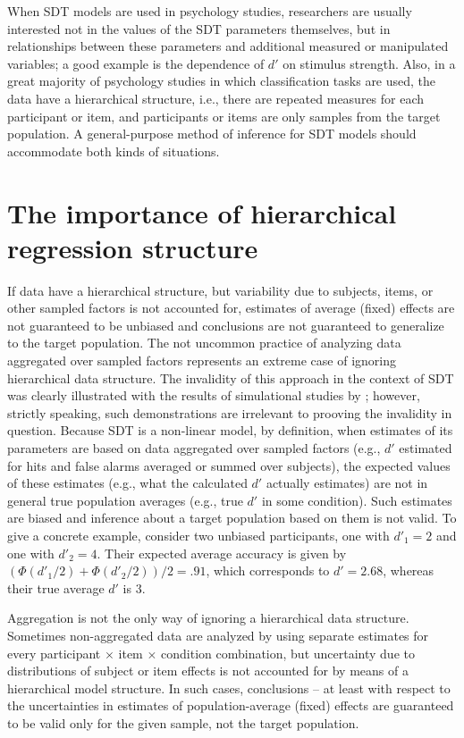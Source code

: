 \documentclass[a4paper,man,apacite,floatsintext]{apa6}
\begin{document}
When SDT models are used in psychology studies, researchers are
usually interested not in the values of the SDT parameters themselves,
but in relationships between these parameters and additional measured
or manipulated variables; a good example is the dependence of $d'$ on
stimulus strength. Also, in a great majority of psychology studies in
which classification tasks are used, the data have a hierarchical
structure, i.e., there are repeated measures for each participant or
item, and participants or items are only samples from the target
population. A general-purpose method of inference for SDT models
should accommodate both kinds of situations.

\section{The importance of hierarchical regression structure}

If data have a hierarchical structure, but variability due to
subjects, items, or other sampled factors is not accounted for,
estimates of average (fixed) effects are not guaranteed to be unbiased
and conclusions are not guaranteed to generalize to the target
population. The not uncommon practice of analyzing data aggregated
over sampled factors represents an extreme case of ignoring
hierarchical data structure. The invalidity of this approach in the
context of SDT was clearly illustrated with the results of
simulational studies by ; however,
strictly speaking, such demonstrations are irrelevant to prooving the
invalidity in question. Because SDT is a non-linear model, by
definition, when estimates of its parameters are based on data
aggregated over sampled factors (e.g., $d'$ estimated for hits and
false alarms averaged or summed over subjects), the expected values of
these estimates (e.g., what the calculated $d'$ actually estimates)
are not in general true population averages (e.g., true $d'$ in some
condition). Such estimates are biased and inference about a target
population based on them is not valid. To give a concrete example,
consider two unbiased participants, one with $d'_1 = 2$ and one with
$d'_2 = 4$. Their expected average accuracy is given by $(\Phi(d'_1/2)
+ \Phi(d'_2/2)) / 2 = .91$, which corresponds to $d' = 2.68$, whereas
their true average $d'$ is $3$.

Aggregation is not the only way of ignoring a hierarchical data
structure. Sometimes non-aggregated data are analyzed by using
separate estimates for every participant $\times$ item $\times$
condition combination, but uncertainty due to distributions of subject
or item effects is not accounted for by means of a hierarchical model
structure. In such cases, conclusions -- at least with respect to the
uncertainties in estimates of population-average (fixed) effects are
guaranteed to be valid only for the given sample, not the target
population.
\end{document}
